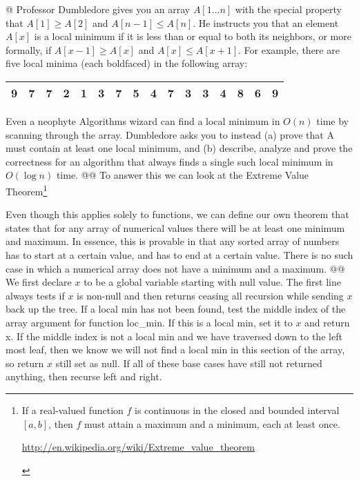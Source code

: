 \documentclass[10pt]{article}
\begin{document}
\begin{easylist}[enumerate]
    @ Professor Dumbledore gives you an array $A[1\ldots n]$ with the special property that $A[1] \ge A[2]$ and $A[n - 1]
    \le A[n]$. He instructs you that an element $A[x]$ is a local minimum if it is less than or equal to both its
    neighbors, or more formally, if $A[x − 1] \ge A[x]$ and $A[x] \le A[x + 1]$. For example, there are five local
    minima (each boldfaced) in the following array:

    \begin{table}[!ht]
        \centering
        \begin{tabular}{|l|l|l|l|l|l|l|l|l|l|l|l|l|l|l|l|}
            \hline
            9 & 7 & 7 & 2 & \textbf{1} & 3 & 7 & 5 & \textbf{4} & 7 & \textbf{3} & \textbf{3} & 4 & 8 & \textbf{6} & 9\\
            \hline
        \end{tabular}
    \end{table}

    Even a neophyte Algorithms wizard can find a local minimum in $O(n)$ time by scanning through the array. Dumbledore
    asks you to instead (a) prove that A must contain at least one local minimum, and (b) describe, analyze and prove
    the correctness for an algorithm that always finds a single such local minimum in $O(\log n)$ time.
    @@ To answer this we can look at the Extreme Value Theorem\footnote{\begin{thm}
        If a real-valued function $f$ is continuous in the closed and bounded interval $[a,b]$, then $f$ must attain a
        maximum and a minimum, each at least once.

        \url{http://en.wikipedia.org/wiki/Extreme_value_theorem}
    \end{thm} }\newline

    Even though this applies solely to functions, we can define our own theorem that states that for any array of
    numerical values there will be at least one minimum and maximum. In essence, this is provable in that any sorted
    array of numbers has to start at a certain value, and has to end at a certain value. There is no such case in which
    a numerical array does not have a minimum and a maximum.
    @@ We first declare $x$ to be a global variable starting with null value. The first line always tests if $x$ is
    non-null and then returns ceasing all recursion while sending $x$ back up the tree. If a local min has not been
    found, test the middle index of the array argument for function loc\_min.  If this is a local min, set it to $x$ and
    return x.  If the middle index is not a local min and we have traversed down to the left most leaf, then we know we
    will not find a local min in this section of the array, so return $x$ still set as null.  If all of these base cases
    have still not returned anything, then recurse left and right.


\end{easylist}
\end{document}
